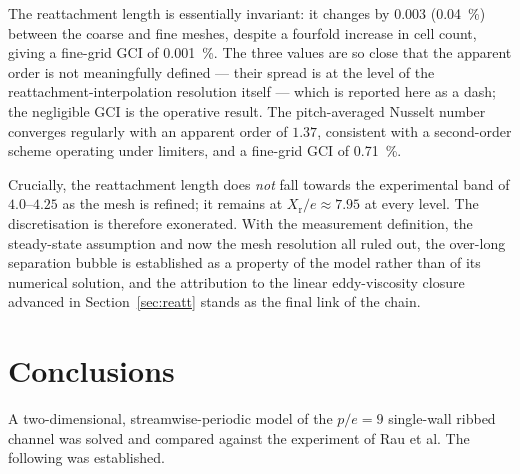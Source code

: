 \documentclass[11pt,a4paper]{article}
\newcommand{\Xr}{X_{\mathrm{r}}}
\begin{document}
The reattachment length is essentially invariant: it changes by $0.003$
(\SI{0.04}{\percent}) between the coarse and fine meshes, despite a fourfold
increase in cell count, giving a fine-grid GCI of \SI{0.001}{\percent}. The
three values are so close that the apparent order is not meaningfully
defined --- their spread is at the level of the reattachment-interpolation
resolution itself --- which is reported here as a dash; the negligible GCI is
the operative result. The pitch-averaged Nusselt number converges regularly
with an apparent order of $1.37$, consistent with a second-order scheme
operating under limiters, and a fine-grid GCI of \SI{0.71}{\percent}.

Crucially, the reattachment length does \emph{not} fall towards the
experimental band of $4.0$--$4.25$ as the mesh is refined; it remains at
$\Xr/e \approx 7.95$ at every level. The discretisation is therefore
exonerated. With the measurement definition, the steady-state assumption and
now the mesh resolution all ruled out, the over-long separation bubble is
established as a property of the model rather than of its numerical
solution, and the attribution to the linear eddy-viscosity closure advanced
in Section~\ref{sec:reatt} stands as the final link of the chain.

\section{Conclusions}
\label{sec:concl}

A two-dimensional, streamwise-periodic model of the $p/e = 9$ single-wall
ribbed channel was solved and compared against the experiment of
Rau et al. The following was established.
\end{document}
